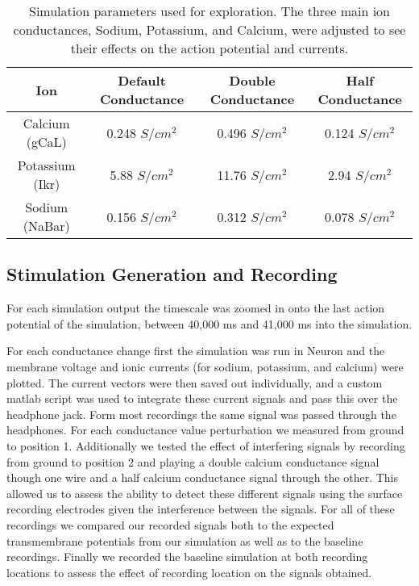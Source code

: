 \documentclass[12pt]{article}
\begin{document}
\begin{table}[H]
	\centering
	\caption{Simulation parameters used for exploration. The three main ion conductances, Sodium, Potassium, and Calcium, were adjusted to see their effects on the action potential and currents.}
	\label{tab:conductances}
	\begin{tabular}{cccc}
		\hline \hline
		Ion  & Default Conductance & Double Conductance & Half Conductance\\ 
		\hline
		Calcium (gCaL)& 0.248 $S/cm^2$&0.496 $S/cm^2$& 0.124 $S/cm^2$\\ 
		Potassium (Ikr) & 5.88 $S/cm^2$ & 11.76 $S/cm^2$& 2.94 $S/cm^2$\\ 
		Sodium (NaBar)& 0.156 $S/cm^2$ & 0.312 $S/cm^2$ & 0.078 $S/cm^2$\\ 
		\hline 
		\hline
	\end{tabular} 
\end{table}
\subsection{Stimulation Generation and Recording}
\par{}
For each simulation output the timescale was zoomed in onto the last action potential of the simulation, between 40,000 ms and 41,000 ms into the simulation.
\par{}
For each conductance change first the simulation was run in Neuron and the membrane voltage and ionic currents (for sodium, potassium, and calcium) were plotted. The current vectors were then saved out individually, and a custom matlab script was used to integrate these current signals and pass this over the headphone jack. Form most recordings the same signal was passed through the headphones. For each conductance value perturbation we measured from ground to position 1. Additionally we tested the effect of interfering signals by recording from ground to position 2 and playing a double calcium conductance signal though one wire and a half calcium conductance signal through the other. This allowed us to assess the ability to detect these different signals using the surface recording electrodes given the interference between the signals. For all of these recordings we compared our recorded signals both to the expected transmembrane potentials from our simulation as well as to the baseline recordings. Finally we recorded the baseline simulation at both recording locations to assess the effect of recording location on the signals obtained. 
\end{document}
